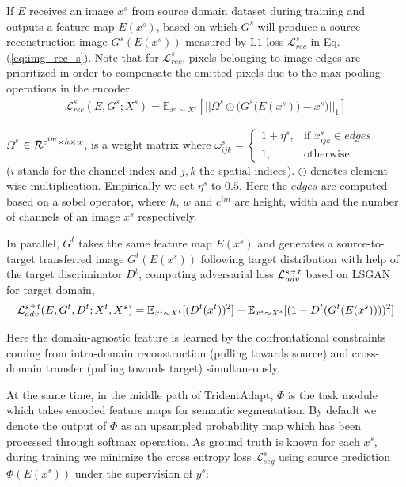 \documentclass{bmvc2k}
\newcommand{\Eq}[1]{Eq. (\ref{eq:#1})}
\newcommand{\veryshortarrow}[1][3pt]{\mathrel{\hbox{\rule[\dimexpr\fontdimen22\textfont2-.2pt\relax]{#1}{.4pt}}\mkern-4mu\hbox{\usefont{U}{lasy}{m}{n}\symbol{41}}}}
\begin{document}
If ${E}$ receives an image ${{x}^{s}}$ from source domain dataset during training and outputs a feature map ${E(x^{s})}$, based on which ${G^{s}}$ will produce a source reconstruction image ${G^{s}({E(x^{s})})}$ measured by L$1$-loss ${\mathcal{L}^{s}_{rec}}$ in \Eq{img_rec_s}. Note that for ${\mathcal{L}^{s}_{rec}}$, pixels belonging to image edges are prioritized in order to compensate the omitted pixels due to the max pooling operations in the encoder.  
\begin{align}
    \label{eq:img_rec_s}
    {\mathcal{L}^{s}_{rec}({E}, {G^{s}}; {X}^{s})} = \mathbb{E}_{{x}^{s} \sim {X}^{s}} [||{\Omega^{s} \odot(G^{s}({E(x^{s}))}} - {x}^{s})||_{1}]
\end{align}

$\Omega^{s}$ $\in \mathcal{R}^{\tiny c^{im} \times \tiny h \times \tiny w}$, is a weight matrix where $\omega^{s}_{ijk}= 
\begin{cases}
    1+\eta^{s},& \text{if } x^{s}_{ijk}\in edges \\
    1,              & \text{otherwise}
\end{cases}$\\ 
(${i}$ stands for the channel index and ${j}, {k}$ the spatial indices). $\odot$ denotes element-wise multiplication. Empirically we set $\eta^{s}$ to $0.5$.
Here the $edges$ are computed based on a sobel operator, where ${h}$, ${w}$ and $c^{im}$ are height, width and the number of channels of an image $x^s$ respectively.

In parallel, ${G^{t}}$ takes the same feature map ${E(x^{s})}$ and generates a source-to-target transferred image ${G^{t}({E(x^{s})})}$ following target distribution with help of the target discriminator ${D^{t}}$, computing adversarial loss ${\mathcal{L}^{s\,\veryshortarrow\,t}_{adv}}$ based on LSGAN~\cite{mao2017least} for target domain,
\begin{align}
    \label{eq:trans_adv_s2t}
    \mathcal{L}^{s\,\veryshortarrow\,t}_{adv} (E, G^{t}, D^{t}; {X}^{t}, {X}^{s}) = \mathbb{E}_{ {x}^{t}\sim {X}^{t}} [(D^{t}({x}^{t}))^2] + \mathbb{E}_{{x}^{s} \sim {X}^{s}} [(1 - D^{t}( G^{t}( {E(x^{s})})))^2]
\end{align}

\noindent Here the domain-agnostic feature is learned by the confrontational constraints coming from intra-domain reconstruction (pulling towards source) and cross-domain transfer (pulling towards target) simultaneously.

At the same time, in the middle path of TridentAdapt, ${\Phi}$ is the task module which takes encoded feature maps for semantic segmentation. By default we denote the output of ${\Phi}$ as an upsampled probability map which has been processed through softmax operation. As ground truth is known for each ${{x}^{s}}$, during training we minimize the cross entropy loss ${\mathcal{L}^{s}_{seg}}$ using source prediction ${\Phi({E(x^{s})})}$ under the supervision of ${{y}^{s}}$:
\end{document}
